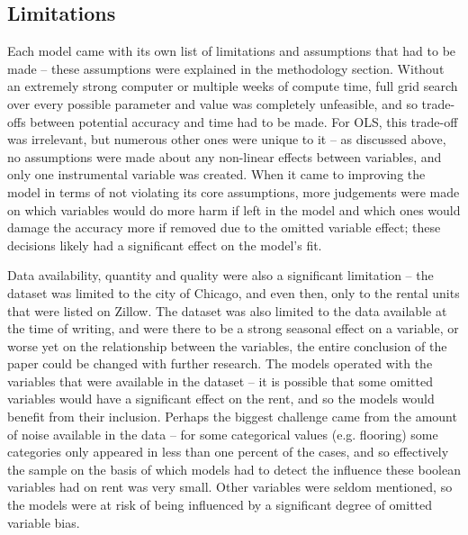 \documentclass[12pt]{report}
\begin{document}
\subsection{Limitations}
Each model came with its own list of limitations and assumptions that had to be made -- these assumptions were explained in the methodology section. Without an extremely strong computer or multiple weeks of compute time, full grid search over every possible parameter and value was completely unfeasible, and so trade-offs between potential accuracy and time had to be made. For OLS, this trade-off was irrelevant, but numerous other ones were unique to it -- as discussed above, no assumptions were made about any non-linear effects between variables, and only one instrumental variable was created. When it came to improving the model in terms of not violating its core assumptions, more judgements were made on which variables would do more harm if left in the model and which ones would damage the accuracy more if removed due to the omitted variable effect; these decisions likely had a significant effect on the model's fit.

Data availability, quantity and quality were also a significant limitation -- the dataset was limited to the city of Chicago, and even then, only to the rental units that were listed on Zillow. The dataset was also limited to the data available at the time of writing, and were there to be a strong seasonal effect on a variable, or worse yet on the relationship between the variables, the entire conclusion of the paper could be changed with further research. The models operated with the variables that were available in the dataset -- it is possible that some omitted variables would have a significant effect on the rent, and so the models would benefit from their inclusion. Perhaps the biggest challenge came from the amount of noise available in the data -- for some categorical values (e.g. flooring) some categories only appeared in less than one percent of the cases, and so effectively the sample on the basis of which models had to detect the influence these boolean variables had on rent was very small. Other variables were seldom mentioned, so the models were at risk of being influenced by a significant degree of omitted variable bias.
\end{document}
